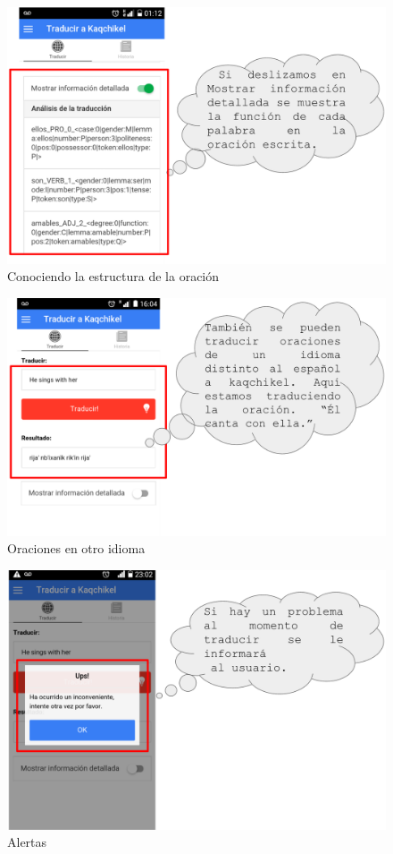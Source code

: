\documentclass[landscape,12pt]{article}
\begin{document}
\begin{figure}[htb]
	\centering
	\includegraphics[width=16cm]{ml_6}
	\caption{Conociendo la estructura de la oración}
	\label{fig:ml6}
\end{figure}

\newpage

\begin{figure}[htb]
	\centering
	\includegraphics[width=17cm]{ml_7}
	\caption{Oraciones en otro idioma}
	\label{fig:ml7}
\end{figure}
\newpage

\begin{figure}[htb]
	\centering
	\includegraphics[width=17cm]{ml_8}
	\caption{Alertas}
	\label{fig:ml8}
\end{figure}
\newpage
\end{document}

